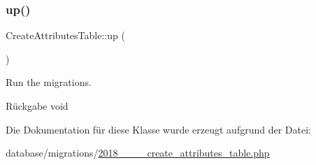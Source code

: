\subsubsection{\texorpdfstring{up()}{up()}}
{\footnotesize\ttfamily Create\+Attributes\+Table\+::up (\begin{DoxyParamCaption}{ }\end{DoxyParamCaption})}

Run the migrations.

\begin{DoxyReturn}{Rückgabe}
void 
\end{DoxyReturn}


Die Dokumentation für diese Klasse wurde erzeugt aufgrund der Datei\+:\begin{DoxyCompactItemize}
\item 
database/migrations/\hyperlink{2018__06__15__144445__create__attributes__table_8php}{2018\+\_\+\_\+\_\+\_\+create\+\_\+attributes\+\_\+table.\+php}\end{DoxyCompactItemize}
